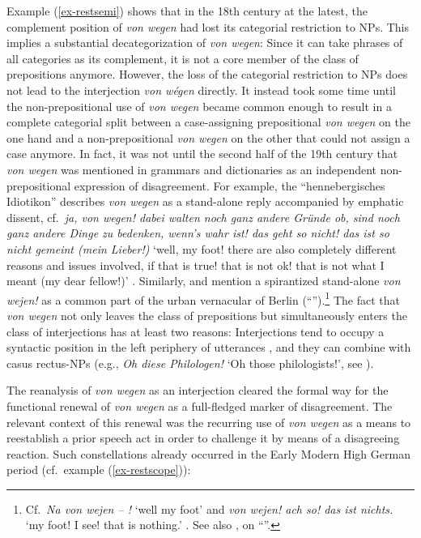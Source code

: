 \documentclass[output=paper
  ,nobabel
  ,draftmode
  ,babelshorthands
  ,colorlinks, citecolor=brown
]{langscibook}
\begin{document}
\largerpage
Example (\ref{ex-restsemi}) shows that in the 18th century at the latest, the complement position of \emph{von wegen} had lost its categorial restriction to NPs. This implies a substantial decategorization of \emph{von wegen}: Since it can take phrases of all categories as its complement, it is not a core member of the class of prepositions anymore. However, the loss of the categorial restriction to NPs does not lead to the interjection \emph{von wégen} directly. It instead took some time until the non-prepositional use of \emph{von wegen} became common enough to result in a complete categorial split between a case-assigning prepositional \emph{von wegen} on the one hand and a non-prepositional \emph{von wegen} on the other that could not assign a case anymore. In fact, it was not until the second half of the 19th century that \emph{von wegen} was mentioned in grammars and dictionaries as an independent non-prepositional expression of disagreement. For example, the ``hennebergisches Idiotikon'' describes \emph{von wegen} as a stand-alone reply accompanied by emphatic dissent, cf.\ \emph{ja, von wegen! dabei walten noch ganz andere Gründe ob, sind noch ganz andere Dinge zu bedenken, wenn’s wahr ist! das geht so nicht! das ist so nicht gemeint (mein Lieber!)} `well, my foot! there are also completely different reasons and issues involved, if that is true! that is not ok! that is not what I meant (my dear fellow!)' \citep[cf.][271–272]{Spiesz1881}. Similarly, \citet{Meyer1880} and \citet{Brendicke1897} mention a spirantized stand-alone \emph{von wejen!} as a common part of the urban vernacular of Berlin (``'').\footnote{Cf.\ \emph{Na von wejen – !} `well my foot' \citep[89]{Meyer1880} and \emph{von wejen! ach so! das ist nichts.} `my foot! I see! that is nothing.' \citep[190]{Brendicke1897}. See also \citet{Schlobinski1988}, \citet{SchoenfeldSchlobinski1998,Freywald2017} on ``''.}  The fact that \emph{von wegen} not only leaves the class of prepositions but simultaneously enters the class of interjections has at least two reasons: Interjections tend to occupy a syntactic position in the left periphery of utterances \citep[e.g.][31]{Nuebling2004}, and they can combine with casus rectus-NPs (e.g., \emph{Oh diese Philologen!} `Oh those philologists!', see \citealp[321–322]{Fries1992}).

The reanalysis of \emph{von wegen} as an interjection cleared the formal way for the functional renewal of \emph{von wegen} as a full-fledged marker of disagreement. The relevant context of this renewal was the recurring use of \emph{von wegen} as a means to reestablish a prior speech act in order to challenge it by means of a disagreeing reaction. Such constellations already occurred in the Early Modern High German period (cf.\ example (\ref{ex-restscope})):
\end{document}
